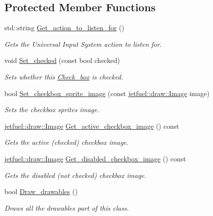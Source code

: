 \subsection*{Protected Member Functions}
\begin{DoxyCompactItemize}
\item 
std\+::string \hyperlink{classjetfuel_1_1gui_1_1Check__box_a6dbbadfa0e40212fd0d133ecd2924fa8}{Get\+\_\+action\+\_\+to\+\_\+listen\+\_\+for} ()
\begin{DoxyCompactList}\small\item\em Gets the Universal Input System action to listen for. \end{DoxyCompactList}\item 
void \hyperlink{classjetfuel_1_1gui_1_1Check__box_ac422c99da29eab41b4849d6d0a55ff70}{Set\+\_\+checked} (const bool checked)
\begin{DoxyCompactList}\small\item\em Sets whether this \hyperlink{classjetfuel_1_1gui_1_1Check__box}{Check\+\_\+box} is checked. \end{DoxyCompactList}\item 
bool \hyperlink{classjetfuel_1_1gui_1_1Check__box_a276fb1567260c41b07079c600143ce3d}{Set\+\_\+checkbox\+\_\+sprite\+\_\+image} (const \hyperlink{classjetfuel_1_1draw_1_1Image}{jetfuel\+::draw\+::\+Image} image)
\begin{DoxyCompactList}\small\item\em Sets the checkbox sprite\textquotesingle{}s image. \end{DoxyCompactList}\item 
\hyperlink{classjetfuel_1_1draw_1_1Image}{jetfuel\+::draw\+::\+Image} \hyperlink{classjetfuel_1_1gui_1_1Check__box_a0771bcece30b82b65fad29ee66a28f27}{Get\+\_\+active\+\_\+checkbox\+\_\+image} () const
\begin{DoxyCompactList}\small\item\em Gets the active (checked) checkbox image. \end{DoxyCompactList}\item 
\hyperlink{classjetfuel_1_1draw_1_1Image}{jetfuel\+::draw\+::\+Image} \hyperlink{classjetfuel_1_1gui_1_1Check__box_ae2f2067e485168d7e8794baa1890e9a6}{Get\+\_\+disabled\+\_\+checkbox\+\_\+image} () const
\begin{DoxyCompactList}\small\item\em Gets the disabled (not checked) checkbox image. \end{DoxyCompactList}\item 
bool \hyperlink{classjetfuel_1_1gui_1_1Check__box_a481eeb0f2c5c6f1165da4243ab5b636a}{Draw\+\_\+drawables} ()
\begin{DoxyCompactList}\small\item\em Draws all the drawables part of this class. \end{DoxyCompactList}\end{DoxyCompactItemize}


